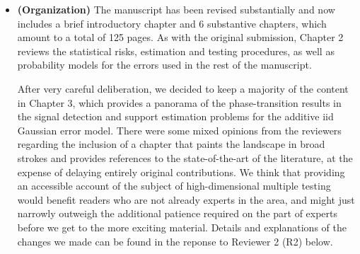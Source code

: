 \documentclass[11pt]{article}
\begin{document}
\begin{itemize}
%   
%   
%    
  
 
  \item {\bf (Organization)} 
  The manuscript has been revised substantially and now includes a brief introductory chapter and 6 substantive chapters, which amount to a total of 125 pages.
  As with the original submission, Chapter 2 reviews the statistical risks, estimation and testing procedures, as well as probability models for the errors used in the rest of the manuscript. 
  
  After very careful deliberation, we decided to keep a majority of the content in Chapter 3, which provides a panorama of the phase-transition results in the signal detection and support estimation problems for the additive iid Gaussian error model.
  There were some mixed opinions from the reviewers regarding the inclusion of a chapter that paints the landscape in broad strokes and provides references to the state-of-the-art of the literature, at the expense of delaying entirely original contributions.
  We think that providing an accessible account of the subject of high-dimensional multiple testing would benefit readers who are not already experts in the area, and might just narrowly outweigh the additional patience required on the part of experts before we get to the more exciting material.
  Details and explanations of the changes we made can be found in the reponse to Reviewer 2 (R2) below.
  

\end{itemize}
\end{document}
